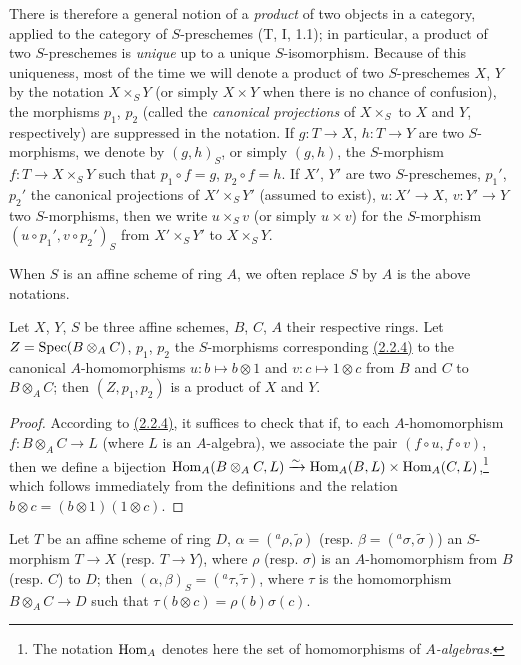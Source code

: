 There is therefore a general notion of a {\em product} of two objects in a category, applied
to the category of $S$-preschemes (T, I, 1.1); in particular, a product of two $S$-preschemes
is {\em unique} up to a unique $S$-isomorphism. Because of this uniqueness, most of the time
we will denote a product of two $S$-preschemes $X$, $Y$ by the notation $X\times_S Y$ (or
simply $X\times Y$ when there is no chance of confusion), the morphisms $p_1$, $p_2$ (called
the {\em canonical projections} of $X\times_S$ to $X$ and $Y$, respectively) are suppressed
in the notation. If $g:T\to X$, $h:T\to Y$ are two $S$-morphisms, we denote by $(g,h)_S$, or
simply $(g,h)$, the $S$-morphism $f:T\to X\times_S Y$ such that $p_1\circ f=g$,
$p_2\circ f=h$. If $X'$, $Y'$ are two $S$-preschemes, $p_1'$, $p_2'$ the canonical
projections of $X'\times_S Y'$ (assumed to exist), $u:X'\to X$, $v:Y'\to Y$ two
$S$-morphisms, then we write $u\times_S v$ (or simply $u\times v$) for the $S$-morphism
$(u\circ p_1',v\circ p_2')_S$ from $X'\times_S Y'$ to $X\times_S Y$.

When $S$ is an affine scheme of ring $A$, we often replace $S$
by $A$ is the above notations.

\begin{prop}[3.2.2]
\label{prop-1.3.2.2}
Let $X$, $Y$, $S$ be three affine schemes, $B$, $C$, $A$ their respective rings. Let
$Z={\mathop{\mathrm{Spec}}\nolimits}(B\otimes_A C)$, $p_1$, $p_2$ the $S$-morphisms corresponding \hyperref[prop-1.2.2.4]{(2.2.4)} to
the canonical $A$-homomorphisms $u:b\mapsto b\otimes 1$ and $v:c\mapsto 1\otimes c$ from $B$
and $C$ to $B\otimes_A C$; then $(Z,p_1,p_2)$ is a product of $X$ and $Y$.
\end{prop}

\begin{proof}
\label{proof-prop-1.3.2.2}
According to \hyperref[prop-1.2.2.4]{(2.2.4)}, it suffices to check that if, to each $A$-homomorphism
$f:B\otimes_A C\to L$ (where $L$ is an $A$-algebra), we associate the pair
$(f\circ u,f\circ v)$, then we define a bijection
${\mathop{\mathrm{Hom}}\nolimits}_A(B\otimes_A C,L)\xrightarrow{\sim}{\mathop{\mathrm{Hom}}\nolimits}_A(B,L)\times{\mathop{\mathrm{Hom}}\nolimits}_A(C,L)$,\footnote{The notation ${\mathop{\mathrm{Hom}}\nolimits}_A$
denotes here the set of homomorphisms of {\em $A$-algebras}.} which follows immediately
from the definitions and the relation $b\otimes c=(b\otimes 1)(1\otimes c)$.
\end{proof}

\begin{cor}[3.2.3]
\label{cor-1.3.2.3}
Let $T$ be an affine scheme of ring $D$, $\alpha=({}^a\rho,\widetilde{\rho})$
(resp. $\beta=({}^a\sigma,\widetilde{\sigma})$) an $S$-morphism $T\to X$ (resp. $T\to Y$),
where $\rho$ (resp. $\sigma$) is an $A$-homomorphism from $B$ (resp. $C$) to $D$; then
$(\alpha,\beta)_S=({}^a\tau,\widetilde{\tau})$, where $\tau$ is the homomorphism
$B\otimes_A C\to D$ such that $\tau(b\otimes c)=\rho(b)\sigma(c)$.
\end{cor}

